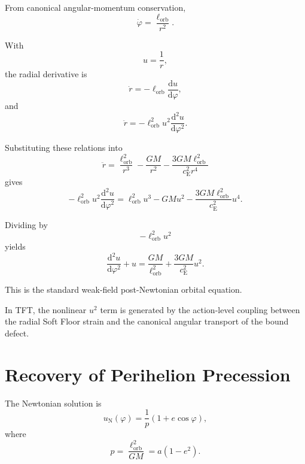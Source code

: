 From canonical angular-momentum conservation,
\begin{equation}
    \dot{\varphi} = \frac{\ell_{\mathrm{orb}}}{r^2}.
\end{equation}

With
\begin{equation}
    u = \frac{1}{r},
\end{equation}
the radial derivative is
\begin{equation}
    \dot{r} = -\ell_{\mathrm{orb}} \frac{\mathrm{d}u}{\mathrm{d}\varphi},
\end{equation}
and
\begin{equation}
    \ddot{r} = -\ell_{\mathrm{orb}}^2 u^2 \frac{\mathrm{d}^2u}{\mathrm{d}\varphi^2}.
\end{equation}

Substituting these relations into
\begin{equation}
    \ddot{r} = \frac{\ell_{\mathrm{orb}}^2}{r^3} - \frac{GM}{r^2} - \frac{ 3GM\ell_{\mathrm{orb}}^2 }{ c_{\mathrm{E}}^2r^4 }
\end{equation}
gives
\begin{equation}
    -\ell_{\mathrm{orb}}^2 u^2 \frac{\mathrm{d}^2u}{\mathrm{d}\varphi^2} = \ell_{\mathrm{orb}}^2 u^3 - GMu^2 - \frac{ 3GM\ell_{\mathrm{orb}}^2 }{ c_{\mathrm{E}}^2 } u^4.
\end{equation}

Dividing by
\begin{equation}
    -\ell_{\mathrm{orb}}^2 u^2
\end{equation}
yields
\begin{equation}
    \boxed{ \frac{\mathrm{d}^2u}{\mathrm{d}\varphi^2} + u = \frac{GM}{\ell_{\mathrm{orb}}^2} + \frac{3GM}{c_{\mathrm{E}}^2}u^2 }.
\end{equation}

This is the standard weak-field post-Newtonian orbital equation.

In TFT, the nonlinear $u^2$ term is generated by the action-level coupling between the radial Soft Floor strain and the canonical angular transport of the bound defect.

\section{Recovery of Perihelion Precession}

The Newtonian solution is
\begin{equation}
    u_{\mathrm{N}}(\varphi) = \frac{1}{p} \left( 1+e\cos\varphi \right),
\end{equation}
where
\begin{equation}
    p = \frac{\ell_{\mathrm{orb}}^2}{GM} = a(1-e^2).
\end{equation}

